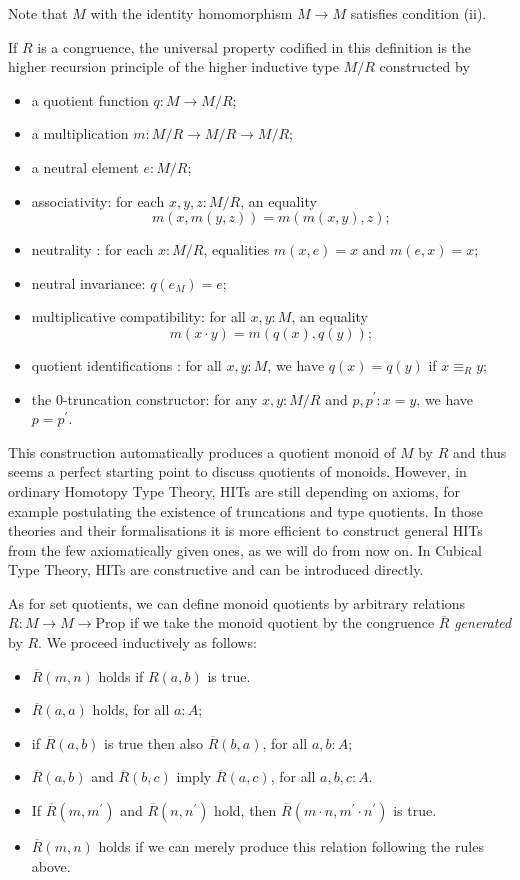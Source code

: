 \documentclass{amsart}
\theoremstyle{plain}
\numberwithin{equation}{section} %
\numberwithin{figure}{section} %
\theoremstyle{plain}
\theoremstyle{plain}
\theoremstyle{plain}
\theoremstyle{plain}
\theoremstyle{plain}
\theoremstyle{plain}
\theoremstyle{remark}
\theoremstyle{remark}
\theoremstyle{remark}
\begin{document}
Note that $M$ with the identity homomorphism $M \rightarrow M$ satisfies condition (ii).

If $R$ is a congruence, the universal property codified in this definition is the higher recursion principle of the higher inductive type $M/R$ constructed by
\begin{itemize}
\item a quotient function $q : M \rightarrow M/R$;
\item a multiplication $m : M/R \rightarrow M/R \rightarrow M/R$;
\item a neutral element $e : M/R$;
\item associativity: for each $x, y, z : M/R$, an equality 
\[ m(x,m(y, z)) = m(m(x, y), z); \]
\item neutrality : for each $x : M/R$, equalities $m(x, e) = x$ and $m(e, x) = x$;
\item neutral invariance: $q(e_M) = e$;
\item multiplicative compatibility: for all $x, y : M$, an equality 
\[ m(x \cdot y) = m(q(x), q(y)); \] 
\item quotient identifications : for all $x, y : M$, we have $q(x) = q(y)$ if $x \equiv_R y$;  
\item the $0$-truncation constructor: for any $x, y : M/R$ and $p, p^\prime : x = y$, we have $p = p^\prime$.
\end{itemize}

This construction automatically produces a quotient monoid of $M$ by $R$ and thus seems a perfect starting point to discuss quotients of monoids. However, in ordinary Homotopy Type Theory, HITs are still depending on axioms, for example postulating the existence of truncations and type quotients. In those theories and their formalisations it is more efficient to construct general HITs from the few axiomatically given ones, as we will do from now on. In Cubical Type Theory, HITs are constructive and can be introduced directly.

As for set quotients, we can define monoid quotients by arbitrary relations $R : M \rightarrow M \rightarrow \mathrm{Prop}$ if we take the monoid quotient by the congruence $\overline{R}$ \textit{generated} by $R$.
We proceed inductively as follows:
\begin{itemize}  %
\item $\overline{R}(m, n)$ holds if $R(a, b)$ is true.
\item $\overline{R}(a, a)$ holds, for all $a : A$;
\item if $\overline{R}(a, b)$ is true then also $\overline{R}(b, a)$, for all $a, b : A$; 
\item $\overline{R}(a, b)$ and $\overline{R}(b, c)$ imply $\overline{R}(a, c)$, for all $a, b, c : A$.
\item If $\overline{R}(m, m^\prime)$ and $\overline{R}(n, n^\prime)$ hold, then $\overline{R}(m \cdot n, m^\prime \cdot n^\prime)$ is true.
\item  $\overline{R}(m, n)$ holds if we can merely produce this relation following the rules above.
\end{itemize}
\end{document}
